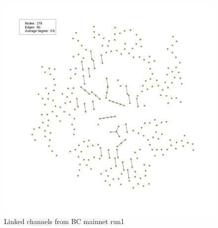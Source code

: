 \begin{figure}[h]
    \centering
    \includegraphics[width=14cm]{figures/graphs/cg_bc_mainnet_run1.png}
    \caption{Linked channels from BC mainnet run1}
    \label{fig:channelGraphLNTS}
\end{figure}